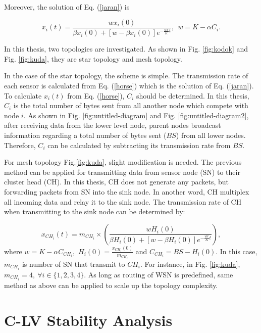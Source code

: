 Moreover, the solution of Eq. (\ref{jaran}) is 

\begin{equation}
\label{horse}
x_i(t)=\frac{wx_i(0)}{\beta x_i(0) + [w-\beta x_i(0)]e^{-\frac{wr}{K}t}},~~w=K-\alpha C_i.
\end{equation}

In this thesis, two topologies are investigated. As shown in Fig. \ref{fig:kodok} and Fig. \ref{fig:kuda}, they are star topology and mesh topology.

In the case of the star topology, the scheme is simple.    The transmission rate of each sensor is calculated from Eq. (\ref{horse}) which is the solution of Eq. (\ref{jaran}). To calculate $x_i(t)$ from Eq. (\ref{horse}), $C_i$ should be determined. In this thesis, $C_i$ is the total number of bytes sent from all another node which compete with node $i$. As shown in Fig. \ref{fig:untitled-diagram} and Fig. \ref{fig:untitled-diagram2}, after receiving data from the lower level node, parent nodes broadcast information regarding a total number of bytes sent ($BS$) from all lower nodes. Therefore, $C_i$ can be calculated by subtracting its transmission rate from $BS$.

For mesh topology Fig.\ref{fig:kuda},  slight modification is needed. The previous method can be applied for transmitting data from sensor node (SN) to their cluster head (CH). In this thesis, CH does not generate any packets, but forwarding packets from SN into the sink node. In another word, CH multiplex all incoming data and relay it to the sink node. The transmission rate of CH when transmitting to the sink node can be determined by:

\begin{equation}
\label{horseliar}
x_{{CH}_i}(t)= m_{{CH}_i} \times (\frac{wH_i(0)}{\beta H_i(0) + [w-\beta H_i(0)]e^{-\frac{wr}{K}t}}),
\end{equation}
where $w=K-\alpha C_{{CH}_i},$ $H_i(0) = \frac{x_{{CH}_i}(0)}{m_{{CH}_i}}$ and $C_{{CH}_i} = BS - H_i(0)$. In this case, $m_{{CH}_i}$ is number of SN that transmit to $CH_i$. For instance, in Fig. \ref{fig:kuda}, $m_{{CH}_i}=4,~\forall i \in \{1,2,3,4\}$. As long as routing of WSN is predefined, same method as above can be applied to scale up the topology complexity.

\section{C-LV Stability Analysis}

